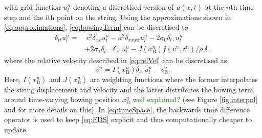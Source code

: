 \documentclass[twoside,a4paper,dvipsnames]{article}
\def\SWcomment[#1]{\textcolor{Green}{#1}}
\begin{document}
with grid function $u_l^n$ denoting a discretised version of $u(x,t)$ at the $n$th time step and the $l$th point on the string. Using the approximations shown in \eqref{eq:approximations}, \eqref{eq:bowingTerm} can be discretised to
\begin{equation}
  \begin{aligned}
    \label{eq:FDS}
        \delta_{tt} u_l^n = &\: c^2 \delta_{xx} u_l^n -\kappa^2\delta_{xxxx} u_l^n - 2\sigma_0\delta_{t\cdot} u_l^n
        \\ 
        &+ 2\sigma_1\delta_{t-}\delta_{xx}u_l^n - J(x_\text{B}^n)f(v^n, z^n) / \rho A,
    \end{aligned}
\end{equation}
where the relative velocity described in \eqref{eq:relVel} can be discretised as
\begin{equation}\label{eq:discRelVel}
v^n = I(x_\text{B}^n)\delta_{t\cdot}u_l^n -  v_\text{B}^n.
\end{equation}
    Here, $I(x_\text{B}^n)$ and $J(x_\text{B}^n)$ are weighting functions where the former interpolates the string displacement and velocity and the latter distributes the bowing term around time-varying bowing position $x_\text{B}^n$  \SWcomment[well explained?] (see Figure \ref{fig:interpol} and \cite{Bilbao2009}
for more details on this). In \eqref{eq:timeSpace}, the backwards time difference operator is used to keep \eqref{eq:FDS} explicit and thus computationally cheaper to update.
\end{document}
